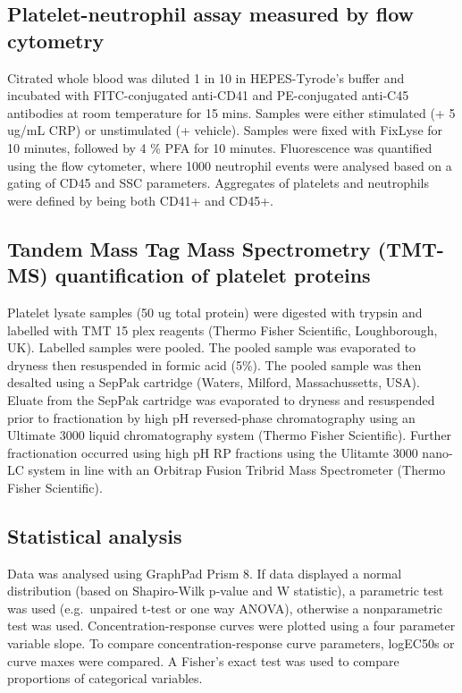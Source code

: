 \documentclass[11pt,twoside]{bristolthesis}
\begin{document}
\hypertarget{platelet-neutrophil-assay-measured-by-flow-cytometry}{%
\subsection{Platelet-neutrophil assay measured by flow cytometry}\label{platelet-neutrophil-assay-measured-by-flow-cytometry}}

Citrated whole blood was diluted 1 in 10 in HEPES-Tyrode's buffer and incubated with FITC-conjugated anti-CD41 and PE-conjugated anti-C45 antibodies at room temperature for 15 mins. Samples were either stimulated (+ 5 ug/mL CRP) or unstimulated (+ vehicle). Samples were fixed with FixLyse for 10 minutes, followed by 4 \% PFA for 10 minutes. Fluorescence was quantified using the flow cytometer, where 1000 neutrophil events were analysed based on a gating of CD45 and SSC parameters. Aggregates of platelets and neutrophils were defined by being both CD41+ and CD45+.

\hypertarget{tandem-mass-tag-mass-spectrometry-tmt-ms-quantification-of-platelet-proteins}{%
\subsection{Tandem Mass Tag Mass Spectrometry (TMT-MS) quantification of platelet proteins}\label{tandem-mass-tag-mass-spectrometry-tmt-ms-quantification-of-platelet-proteins}}

Platelet lysate samples (50 ug total protein) were digested with trypsin and labelled with TMT 15 plex reagents (Thermo Fisher Scientific, Loughborough, UK). Labelled samples were pooled. The pooled sample was evaporated to dryness then resuspended in formic acid (5\%). The pooled sample was then desalted using a SepPak cartridge (Waters, Milford, Massachussetts, USA). Eluate from the SepPak cartridge was evaporated to dryness and resuspended prior to fractionation by high pH reversed-phase chromatography using an Ultimate 3000 liquid chromatography system (Thermo Fisher Scientific). Further fractionation occurred using high pH RP fractions using the Ulitamte 3000 nano-LC system in line with an Orbitrap Fusion Tribrid Mass Spectrometer (Thermo Fisher Scientific).

\hypertarget{statistical-analysis-1}{%
\subsection{Statistical analysis}\label{statistical-analysis-1}}

Data was analysed using GraphPad Prism 8. If data displayed a normal distribution (based on Shapiro-Wilk p-value and W statistic), a parametric test was used (e.g.~unpaired t-test or one way ANOVA), otherwise a nonparametric test was used. Concentration-response curves were plotted using a four parameter variable slope. To compare concentration-response curve parameters, logEC50s or curve maxes were compared. A Fisher's exact test was used to compare proportions of categorical variables.
\end{document}
